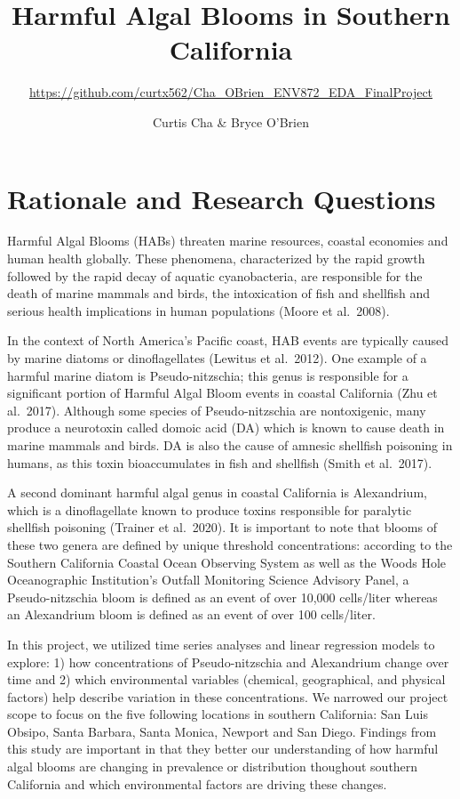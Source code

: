 \documentclass[
  12pt,
]{article}
\title{Harmful Algal Blooms in Southern California}
\subtitle{\url{https://github.com/curtx562/Cha_OBrien_ENV872_EDA_FinalProject}}
\author{Curtis Cha \& Bryce O'Brien}
\date{}
\begin{document}
\maketitle

\newpage
\tableofcontents 
\newpage
\listoftables 
\newpage
\listoffigures 
\newpage

\hypertarget{rationale-and-research-questions}{%
\section{Rationale and Research
Questions}\label{rationale-and-research-questions}}

Harmful Algal Blooms (HABs) threaten marine resources, coastal economies
and human health globally. These phenomena, characterized by the rapid
growth followed by the rapid decay of aquatic cyanobacteria, are
responsible for the death of marine mammals and birds, the intoxication
of fish and shellfish and serious health implications in human
populations (Moore et al.~2008).

In the context of North America's Pacific coast, HAB events are
typically caused by marine diatoms or dinoflagellates (Lewitus et
al.~2012). One example of a harmful marine diatom is Pseudo-nitzschia;
this genus is responsible for a significant portion of Harmful Algal
Bloom events in coastal California (Zhu et al.~2017). Although some
species of Pseudo-nitzschia are nontoxigenic, many produce a neurotoxin
called domoic acid (DA) which is known to cause death in marine mammals
and birds. DA is also the cause of amnesic shellfish poisoning in
humans, as this toxin bioaccumulates in fish and shellfish (Smith et
al.~2017).

A second dominant harmful algal genus in coastal California is
Alexandrium, which is a dinoflagellate known to produce toxins
responsible for paralytic shellfish poisoning (Trainer et al.~2020). It
is important to note that blooms of these two genera are defined by
unique threshold concentrations: according to the Southern California
Coastal Ocean Observing System as well as the Woods Hole Oceanographic
Institution's Outfall Monitoring Science Advisory Panel, a
Pseudo-nitzschia bloom is defined as an event of over 10,000 cells/liter
whereas an Alexandrium bloom is defined as an event of over 100
cells/liter.

In this project, we utilized time series analyses and linear regression
models to explore: 1) how concentrations of Pseudo-nitzschia and
Alexandrium change over time and 2) which environmental variables
(chemical, geographical, and physical factors) help describe variation
in these concentrations. We narrowed our project scope to focus on the
five following locations in southern California: San Luis Obsipo, Santa
Barbara, Santa Monica, Newport and San Diego. Findings from this study
are important in that they better our understanding of how harmful algal
blooms are changing in prevalence or distribution thoughout southern
California and which environmental factors are driving these changes.
\end{document}
